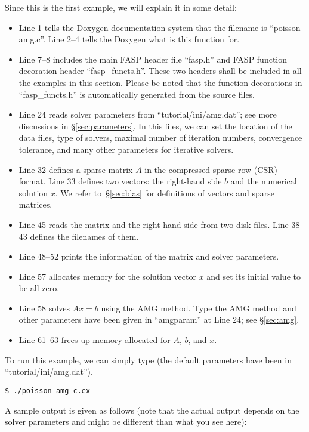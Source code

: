 \documentclass[11pt]{memoir}
\begin{document}
%
Since this is the first example, we will explain it in some detail:
\begin{itemize}
%
\item Line 1 tells the Doxygen documentation system that the filename is ``poisson-amg.c''. Line 2--4 tells the Doxygen what is this function for. 
%
\item Line 7--8 includes the main FASP header file ``fasp.h'' and FASP function decoration header ``fasp\_functs.h''. These two headers shall be included in all the examples in this section. Please be noted that the function decorations in ``fasp\_functs.h'' is automatically generated from the source files. 
%
\item Line 24 reads solver parameters from ``tutorial/ini/amg.dat''; see more discussions in \S\ref{sec:parameters}. In this files, we can set the location of the data files, type of solvers, maximal number of iteration numbers, convergence tolerance, and many other parameters for iterative solvers. 
%
\item Line 32 defines a sparse matrix $A$ in the compressed sparse row (CSR) format. Line 33 defines two vectors: the right-hand side $b$ and the numerical solution $x$. We refer to~\S\ref{sec:blas} for definitions of vectors and sparse matrices.
%
\item Line 45 reads the matrix and the right-hand side from two disk files. Line 38--43 defines the filenames of them.
%
\item Line 48--52 prints the information of the matrix and solver parameters. 
%
\item Line 57 allocates memory for the solution vector $x$ and set its initial value to be all zero. 
%
\item Line 58 solves $Ax=b$ using the AMG method. Type the AMG method and other parameters have been given in ``amgparam'' at Line 24; see \S\ref{sec:amg}.
%
\item Line 61--63 frees up memory allocated for $A$, $b$, and $x$.
\end{itemize}
%
To run this example, we can simply type (the default parameters have been in ``tutorial/ini/amg.dat'').
%
\begin{lstlisting}[numbers=none]
$ ./poisson-amg-c.ex
\end{lstlisting}
%
A sample output is given as follows (note that the actual output depends on the solver parameters and might be different than what you see here):
\end{document}
